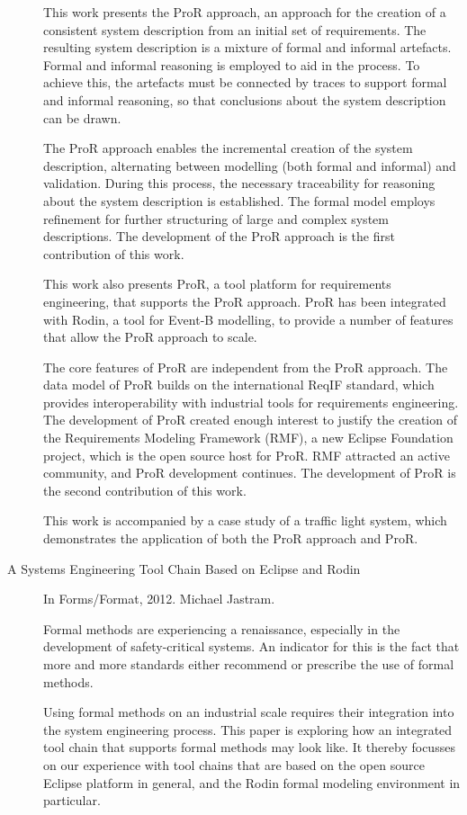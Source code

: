 \begin{description}
This work presents the ProR approach, an approach for the creation of a consistent system description from an initial set of requirements. The resulting system description is a mixture of formal and informal artefacts. Formal and informal reasoning is employed to aid in the process. To achieve this, the artefacts must be connected by traces to support formal and informal reasoning, so that conclusions about the system description can be drawn.

The ProR approach enables the incremental creation of the system description, alternating between modelling (both formal and informal) and validation. During this process, the necessary traceability for reasoning about the system description is established. The formal model employs refinement for further structuring of large and complex system descriptions. The development of the ProR approach is the first contribution of this work.

This work also presents ProR, a tool platform for requirements engineering, that supports the ProR approach. ProR has been integrated with Rodin, a tool for Event-B modelling, to provide a number of features that allow the ProR approach to scale.

The core features of ProR are independent from the ProR approach. The data model of ProR builds on the international ReqIF standard, which provides interoperability with industrial tools for requirements engineering. The development of ProR created enough interest to justify the creation of the Requirements Modeling Framework (RMF), a new Eclipse Foundation project, which is the open source host for ProR. RMF attracted an active community, and ProR development continues. The development of ProR is the second contribution of this work.

This work is accompanied by a case study of a traffic light system, which demonstrates the application of both the ProR approach and ProR.

\item[A Systems Engineering Tool Chain Based on Eclipse and Rodin] In Forms/Format, 2012. Michael Jastram.

Formal methods are experiencing a renaissance, especially in the development of safety-critical systems. An indicator for this is the fact that more and more standards either recommend or prescribe the use of formal methods.

Using formal methods on an industrial scale requires their integration into the system engineering process. This paper is exploring how an integrated tool chain that supports formal methods may look like. It thereby focusses on our experience with tool chains that are based on the open source Eclipse platform in general, and the Rodin formal modeling environment in particular.


\end{description}
